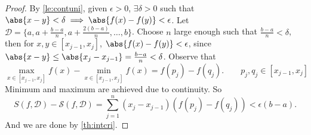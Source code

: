 \begin{proof}
    By \cref{le:contuni}, given \(\epsilon > 0\), \(\exists \delta>0\) such that \(\abs{x-y} < \delta \implies \abs{f(x) - f(y)}<\epsilon\). Let \(\mathcal{D} = \{a, a + \frac{b-a}{n}, a + \frac{2(b-a)}{n} , \dots, b\}\). Choose \(n\) large enough such that \(\frac{b - a}{n}<\delta\), then for \(x, y \in [x_{j - 1}, x_j]\), \(\abs{f(x) - f(y)}<\epsilon\), since \(\abs{x - y} \leq \abs{x_j - x_{j-1}}=\frac{b-a}{n} <\delta\). Observe that
    \[
        \max_{x\in[x_{j-1},x_j]}f(x) - \min_{x\in[x_{j-1},x_j]}f(x) = f(p_j) - f(q_j). \qquad p_j,q_j \in [x_{j-1},x_j]
    \]
    Minimum and maximum are achieved due to continuity. So
    \[
        S(f,\mathcal{D}) - \mathscr{S}(f,\mathcal{D}) = \sum_{j=1}^{n}(x_j - x_{j-1})(f(p_j)-f(q_j)) < \epsilon (b - a).
    \]
    And we are done by \cref{th:intcri}.
\end{proof}